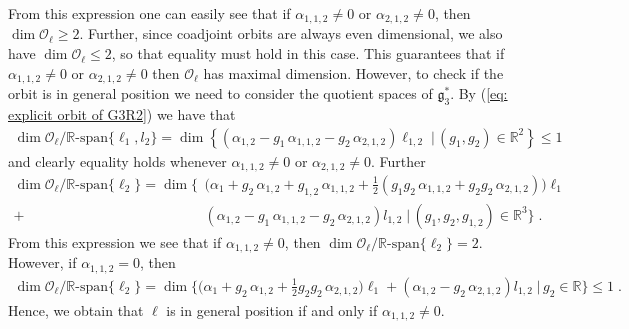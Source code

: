 \documentclass[pdflatex,sn-mathphys-num]{sn-jnl}
\theoremstyle{thmstyletwo}
\theoremstyle{thmstyleone}
\theoremstyle{thmstyletwo}
\newcommand{\fancyg}{\mathfrak{g}}
\newcommand{\R}{\mathbb{R}}
\begin{document}
\begin{appendices}
			From this expression one can easily see that if $\alpha_{1,1,2} \neq 0$ or $\alpha_{2,1,2} \neq 0$, then $\dim \mathcal{O}_{\ell} \geq 2$. Further, since coadjoint orbits are always even dimensional, we also have $\dim \mathcal{O}_{\ell} \leq 2$, so that equality must hold in this case. This guarantees that if $\alpha_{1,1,2} \neq 0$ or $\alpha_{2,1,2} \neq 0$ then $\mathcal{O}_{\ell}$ has maximal dimension. However, to check if the orbit is in general position we need to consider the quotient spaces of $\fancyg_3^*$. By (\ref{eq: explicit orbit of G3R2}) we have that
			\begin{align*}
				\dim \mathcal{O}_{\ell}/\R\text{-span}\{\ell_1,l_2\} = \dim \left\{\left( \alpha_{1,2} 
				- g_1\, \alpha_{1,1,2} - g_2\, \alpha_{2,1,2} \right) \ell_{1,2}
				\;\Big|\, (g_1,g_2) \in \mathbb{R}^2
				\right\} \leq 1
			\end{align*}
			and clearly equality holds whenever $\alpha_{1,1,2} \neq 0$ or $\alpha_{2,1,2} \neq 0$. Further
			\begin{align*}
				\dim \mathcal{O}_{\ell}/\R\text{-span}\{\ell_2\} = \dim \Big\{ 
				&\Big( \alpha_1 
				+ g_2\, \alpha_{1,2} 
				+ g_{1,2}\, \alpha_{1,1,2} 
				+ \frac{1}{2} \left( 
				g_1 g_2\, \alpha_{1,1,2}
				+ g_2 g_2\, \alpha_{2,1,2} 
				\right) \Big) \ell_1 \\
				+ &\left( \alpha_{1,2} 
				- g_1\, \alpha_{1,1,2} - g_2\, \alpha_{2,1,2} \right) l_{1,2}
				\;\Big|\, (g_1,g_2, g_{1,2}) \in \mathbb{R}^3
				\Big\} \;.
			\end{align*}
			From this expression we see that if $\alpha_{1,1,2} \neq 0$, then $\dim \mathcal{O}_{\ell}/\R\text{-span}\{\ell_2\} = 2$. However, if $\alpha_{1,1,2} = 0$, then
			\begin{align*}
				\dim \mathcal{O}_{\ell}/\R\text{-span}\{\ell_2\} = \dim \Big\{ 
				\Big( \alpha_1 
				+ g_2\, \alpha_{1,2}
				+ \frac{1}{2}
				g_2 g_2\, \alpha_{2,1,2} 
				\Big) \ell_1 
				+ \left( \alpha_{1,2} 
				- g_2\, \alpha_{2,1,2} \right) l_{1,2}
				\;\Big|\, g_2 \in \mathbb{R}\Big\} \leq 1 \;.
			\end{align*}
			Hence, we obtain that $\ell$ is in general position if and only if $\alpha_{1,1,2} \neq 0$.
			
			
			

\end{appendices}
\end{document}
